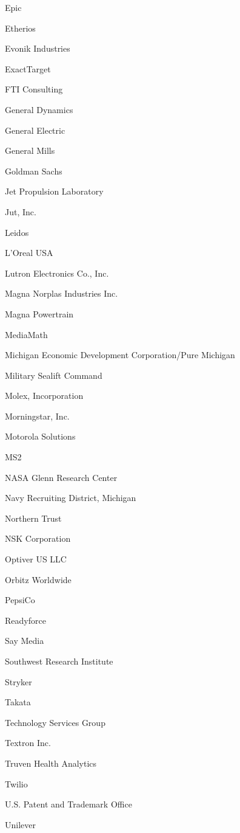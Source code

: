 \documentclass[twoside]{article}
\begin{document}
\begin{center}
\begin{multicols}{5}
\begin{FlushLeft}
\begin{compactitem}
\item Epic
\item Etherios
\item Evonik Industries
\item ExactTarget
\item FTI Consulting
\item General Dynamics
\item General Electric
\item General Mills
\item Goldman Sachs
\item Jet Propulsion Laboratory
\item Jut, Inc.
\item Leidos
\item L'Oreal USA
\item Lutron Electronics Co., Inc.
\item Magna Norplas Industries Inc.
\item Magna Powertrain
\item MediaMath
\item Michigan Economic Development Corporation/Pure Michigan
\item Military Sealift Command
\item Molex, Incorporation
\item Morningstar, Inc.
\item Motorola Solutions
\item MS2
\item NASA Glenn Research Center
\item Navy Recruiting District, Michigan
\item Northern Trust
\item NSK Corporation
\item Optiver US LLC
\item Orbitz Worldwide
\item PepsiCo
\item Readyforce
\item Say Media
\item Southwest Research Institute
\item Stryker
\item Takata
\item Technology Services Group
\item Textron Inc.
\item Truven Health Analytics
\item Twilio
\item U.S. Patent and Trademark Office
\item Unilever

\end{compactitem}
\end{FlushLeft}
\end{multicols}
\end{center}
\end{document}
